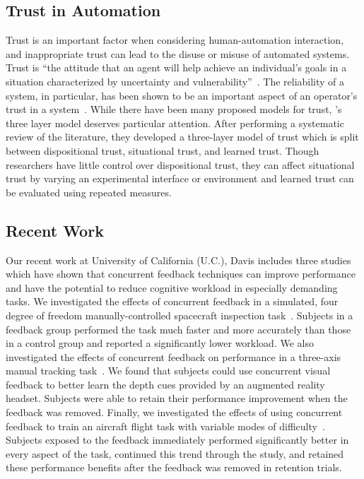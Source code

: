 \subsection{Trust in Automation}
Trust is an important factor when considering human-automation interaction, and inappropriate trust can lead to the disuse or misuse of automated systems.
Trust is ``the attitude that an agent will help achieve an individual's goals in a situation characterized by uncertainty and vulnerability''~\citep{lee_trust_2004}.
The reliability of a system, in particular, has been shown to be an important aspect of an operator's trust in a system~\citep{RN38}.
While there have been many proposed models for trust, \citeauthor{RN39}'s three layer model deserves particular attention.
After performing a systematic review of the literature, they developed a three-layer model of trust which is split between dispositional trust, situational trust, and learned trust.
Though researchers have little control over dispositional trust, they can affect situational trust by varying an experimental interface or environment and learned trust can be evaluated using repeated measures.

\subsection{Recent Work}
Our recent work at University of California (U.C.), Davis includes three studies which have shown that concurrent feedback techniques can improve performance and have the potential to reduce cognitive workload in especially demanding tasks.
We investigated the effects of concurrent feedback in a simulated, four degree of freedom manually-controlled spacecraft inspection task~\citep{karasinski_real-time_2017}.
Subjects in a feedback group performed the task much faster and more accurately than those in a control group and reported a significantly lower workload.
We also investigated the effects of concurrent feedback on performance in a three-axis manual tracking task~\citep{karasinski_evaluating_2019}.
We found that subjects could use concurrent visual feedback to better learn the depth cues provided by an augmented reality headset.
Subjects were able to retain their performance improvement when the feedback was removed.
Finally, we investigated the effects of using concurrent feedback to train an aircraft flight task with variable modes of difficulty~\citep{RN42}.
Subjects exposed to the feedback immediately performed significantly better in every aspect of the task, continued this trend through the study, and retained these performance benefits after the feedback was removed in retention trials.

